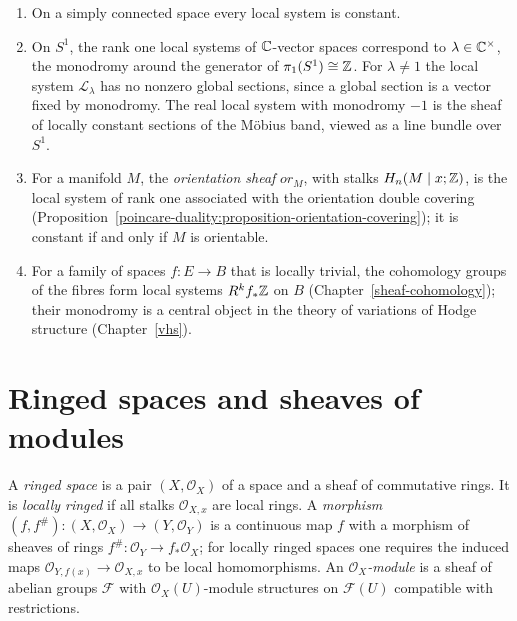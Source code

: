 \begin{example}\label{sheaves:example-local-systems}
\begin{enumerate}
\item On a simply connected space every local system is constant.
\item On $S^1$, the rank one local systems of $\mathbb{C}$-vector spaces correspond to $\lambda \in \mathbb{C}^\times$, the monodromy around the generator of $\pi_1(S^1) \cong \mathbb{Z}$. For
$\lambda \neq 1$ the local system $\mathcal{L}_\lambda$ has no nonzero global sections, since a global section is a vector fixed by monodromy. The real local system with monodromy $-1$ is the
sheaf of locally constant sections of the M\"obius band, viewed as a line bundle over $S^1$.
\item For a manifold $M$, the \emph{orientation sheaf} $\mathit{or}_M$, with stalks $H_n(M \mid x; \mathbb{Z})$, is the local system of rank one associated with the orientation double covering
(Proposition~\ref{poincare-duality:proposition-orientation-covering}); it is constant if and only if $M$ is orientable.
\item For a family of spaces $f \colon E \to B$ that is locally trivial, the cohomology groups of the fibres form local systems $R^kf_*\mathbb{Z}$ on $B$ (Chapter~\ref{sheaf-cohomology}); their
monodromy is a central object in the theory of variations of Hodge structure (Chapter~\ref{vhs}).
\end{enumerate}
\end{example}

\section{Ringed spaces and sheaves of modules}\label{sheaves:section-ringed-spaces}

\begin{definition}\label{sheaves:definition-ringed-space}
A \emph{ringed space} is a pair $(X, \mathcal{O}_X)$ of a space and a sheaf of commutative rings. It is \emph{locally ringed} if all stalks $\mathcal{O}_{X,x}$ are local rings. A
\emph{morphism} $(f, f^\#) \colon (X, \mathcal{O}_X) \to (Y, \mathcal{O}_Y)$ is a continuous map $f$ with a morphism of sheaves of rings $f^\# \colon \mathcal{O}_Y \to f_*\mathcal{O}_X$; for locally
ringed spaces one requires the induced maps $\mathcal{O}_{Y, f(x)} \to \mathcal{O}_{X, x}$ to be local homomorphisms. An \emph{$\mathcal{O}_X$-module} is a sheaf of abelian groups
$\mathcal{F}$ with $\mathcal{O}_X(U)$-module structures on $\mathcal{F}(U)$ compatible with restrictions.
\end{definition}

